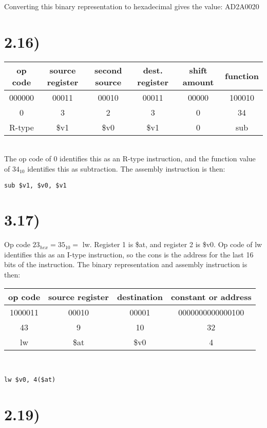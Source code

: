\documentclass[a4paper,11pt]{article}
\begin{document}
\noindent Converting this binary representation to hexadecimal gives the value: AD2A0020


\section*{2.16)} 

\begin{tabular}{| c | c | c | c | c | c |}
  \hline	
  op code & source register & second source & dest. register & shift amount & function \\  \hline  		
  000000 & 00011 & 00010 & 00011 & 00000 & 100010  \\ \hline
  0 & 3 & 2 & 3 & 0 & 34 \\ \hline
  R-type & \$v1 & \$v0 & \$v1 & 0 & sub \\\hline
\end{tabular} \\

The op code of 0 identifies this as an R-type instruction, and the function value of $34_{10}$ identifies this as subtraction.  The assembly instruction is then:

\begin{verbatim}
sub $v1, $v0, $v1
\end{verbatim}


\section*{3.17)} 
 Op code $23_{hex} = 35_{10} =$ lw.  Register 1 is \$at, and register 2 is \$v0.  Op code of lw identifies this as an I-type instruction, so the cons is the address for the last 16 bits of the instruction.  The binary representation and assembly instruction is then: \\
 
 \noindent
 \begin{tabular}{| c | c | c | c |}
  \hline	
  op code & source register & destination & constant or address\\  \hline  		
  1000011 & 00010 & 00001 & 0000000000000100 \\ \hline
  43 & 9 & 10 & 32  \\ \hline
  lw & \$at & \$v0 & 4 \\ \hline
\end{tabular} \\

 
\begin{verbatim}
lw $v0, 4($at)
\end{verbatim}


\section*{2.19)} 

\end{document}
